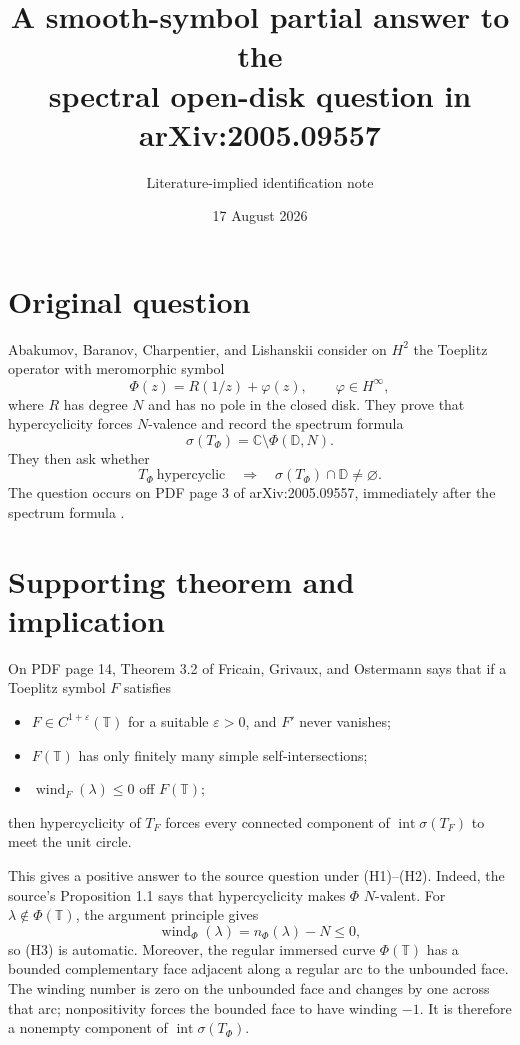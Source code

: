 \documentclass[11pt]{article}
\title{A smooth-symbol partial answer to the\\
spectral open-disk question in arXiv:2005.09557}
\author{Literature-implied identification note}
\date{17 August 2026}
\begin{document}
\maketitle

\begin{center}
\end{center}

\section*{Original question}

Abakumov, Baranov, Charpentier, and Lishanskii consider on $H^2$ the Toeplitz
operator with meromorphic symbol
\[
 \Phi(z)=R(1/z)+\varphi(z),\qquad \varphi\in H^\infty,
\]
where $R$ has degree $N$ and has no pole in the closed disk.  They prove that
hypercyclicity forces $N$-valence and record the spectrum formula
\[
 \sigma(T_\Phi)=\mathbb C\setminus\Phi(\mathbb D,N).
\]
They then ask whether
\[
 T_\Phi\ \text{hypercyclic}
 \quad\Longrightarrow\quad
 \sigma(T_\Phi)\cap\mathbb D\ne\varnothing.
\]
The question occurs on PDF page 3 of arXiv:2005.09557, immediately after the
spectrum formula \cite{ABCL}.

\section*{Supporting theorem and implication}

On PDF page 14, Theorem 3.2 of Fricain, Grivaux, and Ostermann \cite{FGO}
says that if a Toeplitz symbol $F$ satisfies

\begin{itemize}
\item[(H1)] $F\in C^{1+\varepsilon}(\mathbb T)$ for a suitable
$\varepsilon>0$, and $F'$ never vanishes;
\item[(H2)] $F(\mathbb T)$ has only finitely many simple self-intersections;
\item[(H3)] $\operatorname{wind}_F(\lambda)\le0$ off $F(\mathbb T)$;
\end{itemize}

then hypercyclicity of $T_F$ forces every connected component of
$\operatorname{int}\sigma(T_F)$ to meet the unit circle.

This gives a positive answer to the source question under (H1)--(H2).
Indeed, the source's Proposition 1.1 says that hypercyclicity makes $\Phi$
$N$-valent.  For $\lambda\notin\Phi(\mathbb T)$, the argument principle gives
\[
 \operatorname{wind}_\Phi(\lambda)=n_\Phi(\lambda)-N\le0,
\]
so (H3) is automatic.  Moreover, the regular immersed curve
$\Phi(\mathbb T)$ has a bounded complementary face adjacent along a regular
arc to the unbounded face.  The winding number is zero on the unbounded face
and changes by one across that arc; nonpositivity forces the bounded face to
have winding $-1$.  It is therefore a nonempty component of
$\operatorname{int}\sigma(T_\Phi)$.
\end{document}
